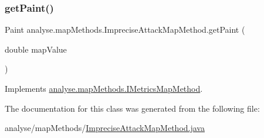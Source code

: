 \subsubsection{\texorpdfstring{get\+Paint()}{getPaint()}}
{\footnotesize\ttfamily Paint analyse.\+map\+Methods.\+Imprecise\+Attack\+Map\+Method.\+get\+Paint (\begin{DoxyParamCaption}\item[{double}]{map\+Value }\end{DoxyParamCaption})\hspace{0.3cm}{\ttfamily [inline]}}



Implements \mbox{\hyperlink{interfaceanalyse_1_1map_methods_1_1_i_metrics_map_method_a102909023c32cebe3bc75052f55b24a0}{analyse.\+map\+Methods.\+I\+Metrics\+Map\+Method}}.



The documentation for this class was generated from the following file\+:\begin{DoxyCompactItemize}
\item 
analyse/map\+Methods/\mbox{\hyperlink{_imprecise_attack_map_method_8java}{Imprecise\+Attack\+Map\+Method.\+java}}\end{DoxyCompactItemize}
